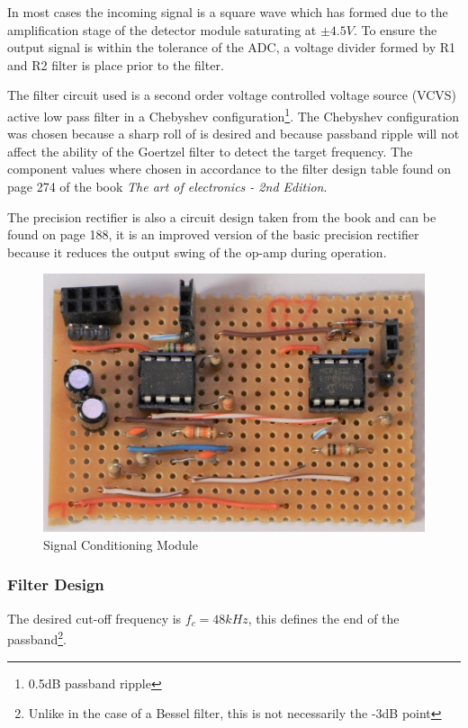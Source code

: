 In most cases the incoming signal is a square wave which has formed due to the amplification stage of the detector module saturating at $\pm 4.5V$. To ensure the output signal is within the tolerance of the ADC, a voltage divider formed by R1 and R2 filter is place prior to the filter.

The filter circuit used is a second order voltage controlled voltage source (VCVS) active low pass filter in a Chebyshev configuration\footnote{0.5dB passband ripple}. The Chebyshev configuration was chosen because a sharp roll of is desired and because passband ripple will not affect the ability of the Goertzel filter to detect the target frequency. The component values where chosen in accordance to the filter design table found on page 274 of the book \textit{The art of electronics - 2nd Edition}\cite{Horowitz1995}.

The precision rectifier is also a circuit design taken from the book and can be found on page 188, it is an improved version of the basic precision rectifier because it reduces the output swing of the op-amp during operation\cite{Horowitz1995}.

\begin{figure}[H]
	\centering
	\includegraphics[width=.6\textwidth]{figures/modules/filtering_conditioning.jpg}
	\caption{Signal Conditioning Module}
	\label{fig:module_filtering_conditioning}
\end{figure}







\subsubsection{Filter Design}


The desired cut-off frequency is \(f_{c} = 48kHz\), this defines the end of the passband\footnote{Unlike in the case of a Bessel filter, this is not necessarily the -3dB point}.

